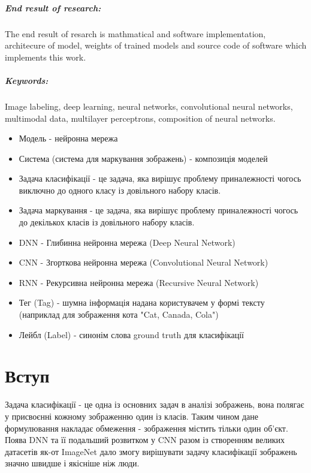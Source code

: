 \documentclass{udstu}
\begin{document}
\paragraph{\textbf{End result of research:}}
The end result of resarch is mathmatical and software implementation, architecure of model,
weights of trained models and source code of software which implements this work.

\paragraph{\textbf{Keywords:}}
Image labeling, deep learning, neural networks, convolutional neural networks, multimodal data,
multilayer perceptrons, composition of neural networks.


\shortings

\begin{itemize}[*]
	\item Модель - нейронна мережа
	\item Система (система для маркування зображень) - композиція моделей
	\item Задача класифікації - це задача, яка вирішує проблему приналежності чогось
	виключно до одного класу із довільного набору класів.
	\item Задача маркування - це задача, яка вирішує проблему приналежності чогось
	до декількох класів із довільного набору класів.
	\item DNN - Глибинна нейронна мережа (Deep Neural Network)
	\item CNN - Згорткова нейронна мережа (Convolutional Neural Network)
	\item RNN - Рекурсивна нейронна мережа (Recursive Neural Network)
	\item Тег (Tag) - шумна інформація надана користувачем у формі тексту
	(наприклад для зображення кота "Cat, Canada, Cola")
	\item Лейбл (Label) - синонім слова ground truth для класифікації
\end{itemize}


\tableofcontents


\chapter{Вступ}

Задача класифікації - це одна із основних задач в аналізі зображень, вона полягає
у присвоєнні кожному зображенню один із класів. Таким чином дане формулювання накладає
обмеження - зображення містить тільки один об'єкт. Поява DNN \cite{dnn-cls}
та її подальший розвитком у CNN \cite{cnn-cls-1,cnn-cls-2} разом із створенням
великих датасетів як-от ImageNet \cite{deng2009imagenet} дало змогу вирішувати задачу
класифікації зображень значно швидше і якісніше ніж люди.
\end{document}
